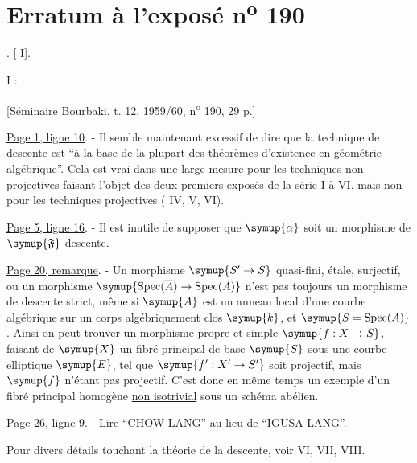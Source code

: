 \clearpage
\chapter*{Erratum à l'exposé n\textsuperscript{o} 190}
\setcounter{footnote}{0}

.  [ I].
\par\noindent I : .

\begin{center}
[Séminaire Bourbaki, t. 12, 1959/60, n\textsuperscript{o} 190, 29 p.]
\end{center}

\noindent\uline{Page 1, ligne 10}. - Il semble maintenant excessif de dire
que la technique de descente est ``à la base de la plupart des théorèmes
d'existence en géométrie algébrique''. Cela est vrai dans une large mesure
pour les techniques non projectives faisant l'objet des deux premiers exposés
de la série  I à VI, mais non pour les techniques projectives ( IV, V,
VI).

\noindent\uline{Page 5, ligne 16}. - Il est inutile de supposer que $\symup{\alpha}$
soit un morphisme de $\symup{\mathfrak F}$-descente.

\noindent\uline{Page 20, remarque}. - Un morphisme
$\symup{S'\to S}$ quasi-fini, étale, surjectif, ou un morphisme
$\symup{\operatorname{Spec}(\overline A)\to\operatorname{Spec}(A)}$ n'est
pas toujours un morphisme de descente strict, même si $\symup{A}$ est un anneau local
d'une courbe algébrique sur un corps algébriquement clos $\symup{k}$, et
$\symup{S=\operatorname{Spec}(A)}$. Ainsi on peut trouver un morphisme propre et simple
$\symup{f:X\to S}$, faisant de $\symup{X}$ un fibré principal de base $\symup{S}$ sous une
courbe elliptique $\symup{E}$, tel que $\symup{f':X'\to S'}$ soit projectif, mais
$\symup{f}$ n'étant pas projectif. C'est donc en même temps un exemple d'un fibré
principal homogène \uline{non isotrivial} sous un schéma abélien.

\noindent\uline{Page 26, ligne 9}. - Lire ``CHOW-LANG'' au lieu de
``IGUSA-LANG''.

Pour divers détails touchant la théorie de la descente, voir  VI, VII,
VIII.

\par\smallskip
\begingroup\footnotesize
\endgroup
